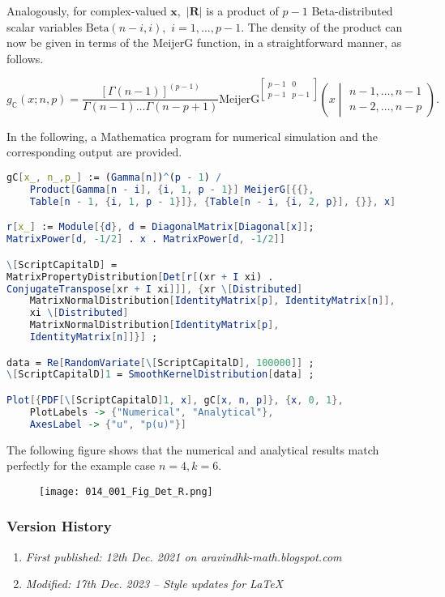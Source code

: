 Analogously, for complex-valued $\boldsymbol{x},$ $|\boldsymbol{R}|$ is a product of $p-1$ Beta-distributed scalar variables $\mathrm{Beta}(n-i,i),$  $i=1,\dots,p-1.$ The density of the product can now be given in terms of the $\mathrm{MeijerG}$ function, in a straightforward manner, as follows.

$$g_\mathbb{C}(x;n,p) = \frac{\left[\Gamma(n-1)\right]^{(p-1)} }{\Gamma(n-1)\dots\Gamma(n-p+1)} \mathrm{MeijerG}^{\begin{bmatrix}p-1 & 0 \\ p-1 & p-1\end{bmatrix}}\left(x\middle|\begin{matrix}n-1,\dots,n-1\\ n-2,\dots,n-p\end{matrix}\right).$$

In the following, a Mathematica program for numerical simulation and the corresponding output are provided.

\begin{lstlisting}[language=Mathematica,numbers=none]
gC[x_, n_,p_] := (Gamma[n])^(p - 1) / 
	Product[Gamma[n - i], {i, 1, p - 1}] MeijerG[{{},
	Table[n - 1, {i, 1, p - 1}]}, {Table[n - i, {i, 2, p}], {}}, x]

r[x_] := Module[{d}, d = DiagonalMatrix[Diagonal[x]]; 
MatrixPower[d, -1/2] . x . MatrixPower[d, -1/2]]

\[ScriptCapitalD] =
MatrixPropertyDistribution[Det[r[(xr + I xi) .
ConjugateTranspose[xr + I xi]]], {xr \[Distributed]
	MatrixNormalDistribution[IdentityMatrix[p], IdentityMatrix[n]],
	xi \[Distributed]
	MatrixNormalDistribution[IdentityMatrix[p],
	IdentityMatrix[n]]}] ;

data = Re[RandomVariate[\[ScriptCapitalD], 100000]] ;
\[ScriptCapitalD]1 = SmoothKernelDistribution[data] ;

Plot[{PDF[\[ScriptCapitalD]1, x], gC[x, n, p]}, {x, 0, 1},
	PlotLabels -> {"Numerical", "Analytical"},
	AxesLabel -> {"u", "p(u)"}]
\end{lstlisting}

The following figure shows that the numerical and analytical results match perfectly for the example case $n=4, k=6.$

\begin{figure}[H]
	\centering
	\texttt{[image: 014\_001\_Fig\_Det\_R.png]}
\end{figure}

\subsubsection{Version History}
\begin{enumerate}
	\item \emph{First published: 12th Dec. 2021 on aravindhk-math.blogspot.com}
	\item \emph{Modified: 17th Dec. 2023 -- Style updates for \LaTeX}
\end{enumerate}
